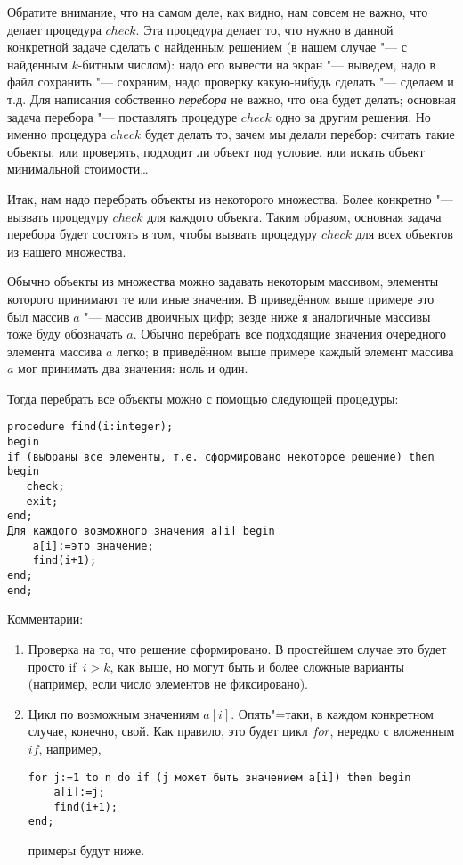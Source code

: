 Обратите внимание, что на самом деле, как видно, нам совсем не важно, что делает процедура $check$. Эта процедура делает то, что нужно в данной конкретной задаче сделать с 
найденным решением (в нашем случае "--- с найденным $k$-битным числом): надо его 
вывести на экран "--- выведем, надо в файл сохранить "--- сохраним, надо проверку 
какую-нибудь сделать "--- сделаем и т.д. Для написания  собственно \textit{перебора} не важно, что она будет делать; основная задача перебора "--- поставлять процедуре $check$ одно за другим решения. Но именно процедура $check$ будет делать то, зачем мы делали 
перебор: считать такие объекты, или проверять, подходит ли объект под условие, или 
искать объект минимальной стоимости\dots


Итак, нам надо перебрать объекты из некоторого множества. Более конкретно "---
вызвать процедуру $check$ для каждого объекта. Таким образом, 
основная задача перебора будет состоять в том, чтобы вызвать процедуру $check$ 
для всех объектов из нашего множества.

Обычно объекты из множества можно задавать некоторым массивом, элементы 
которого принимают те или иные значения. В приведённом выше примере это был 
массив $a$ "--- массив двоичных цифр; везде ниже я аналогичные массивы тоже буду 
обозначать $a$. Обычно перебрать все подходящие значения очередного элемента 
массива $a$ легко; в приведённом выше примере каждый элемент массива $a$ мог 
принимать два значения: ноль и один.

Тогда перебрать все объекты можно с помощью следующей процедуры:

\begin{codesampleo}\begin{verbatim}
procedure find(i:integer);
begin
if (выбраны все элементы, т.е. сформировано некоторое решение) then begin
   check;
   exit;
end;
Для каждого возможного значения a[i] begin
    a[i]:=это значение;
    find(i+1);
end;
end;
\end{verbatim}\end{codesampleo}

Комментарии:
\begin{enumerate}
\item Проверка на то, что решение сформировано. В простейшем случае это будет 
просто if~$i>k$, как выше, но могут быть и более сложные варианты (например, если 
число элементов не фиксировано).
\item Цикл по возможным значениям $a[i]$. Опять"=таки, в каждом конкретном случае, 
конечно, свой. Как правило, это будет цикл $for$, нередко с вложенным $if$, например,
\begin{codesampleo}\begin{verbatim}
for j:=1 to n do if (j может быть значением a[i]) then begin
    a[i]:=j;
    find(i+1);
end;
\end{verbatim}\end{codesampleo}
примеры будут ниже.
\end{enumerate}

